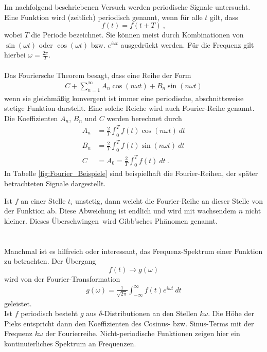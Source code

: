 Im nachfolgend beschriebenen Versuch werden periodische Signale untersucht. \\
Eine Funktion wird (zeitlich) periodisch genannt, wenn für alle $t$ gilt, dass
\[ f(t) = f(t+T) \ , \]
wobei $T$ die Periode bezeichnet. Sie können meist durch Kombinationen von $\sin(\omega t)$ oder $\cos(\omega t)$ bzw. $e^{i\omega t}$ ausgedrückt werden. Für die Frequenz gilt hierbei $\omega = \frac{2\pi}{T} $. \\
\ \\
Das Fouriersche Theorem besagt, dass eine Reihe der Form
\begin{align}
	C + \sum_{n = 1}^{\infty} A_n\cos(n\omega t)+B_n\sin(n\omega t)
\end{align}
wenn sie gleichmäßig konvergent ist immer eine periodische, abschnittsweise stetige Funktion darstellt. Eine solche Reiche wird auch Fourier-Reihe genannt. Die Koeffizienten $A_n$, $B_n$ und $C$ werden berechnet durch
\begin{align}
	A_n &= \frac{2}{T}\int_0^T f(t)\cos(n\omega t)\ dt \\
	B_n &= \frac{2}{T}\int_0^T f(t)\sin(n\omega t)\ dt \\
	C &= A_0 = \frac{2}{T}\int_0^Tf(t)\ dt \ .
\end{align}
In Tabelle \ref{fig:Fourier_Beispiele} sind beispielhaft die Fourier-Reihen, der später betrachteten Signale dargestellt.

Ist $f$ an einer Stelle $t_i$ unstetig, dann weicht die Fourier-Reihe an dieser Stelle von der Funktion ab. Diese Abweichung ist endlich und wird mit wachsendem $n$ nicht kleiner. Dieses \glqq Überschwingen\grqq\ wird Gibb'sches Phänomen genannt. \\
\ \\
\ \\
Manchmal ist es hilfreich oder interessant, das Frequenz-Spektrum einer Funktion zu betrachten. Der Übergang
\[ f(t)\rightarrow g(\omega) \]
wird von der Fourier-Transformation
\begin{align}
	g(\omega) = \frac{1}{\sqrt{2\pi}}\int_{-\infty}^{\infty}f(t)e^{i\omega t}\ dt
\end{align}
geleistet. \\
Ist $f$ periodisch besteht $g$ aus $\delta$-Distributionen an den Stellen $k\omega$. Die Höhe der Pieks entspricht dann den Koeffizienten des Cosinus- bzw. Sinus-Terms mit der Frequenz $k\omega$ der Fourierreihe. Nicht-periodische Funktionen zeigen hier ein kontinuierliches Spektrum an Frequenzen.